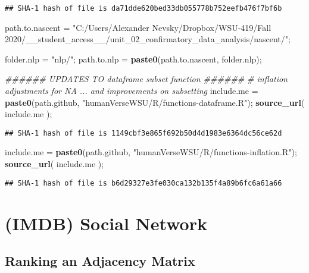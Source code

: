 \documentclass[
]{article}
\newenvironment{Shaded}{\begin{snugshade}}{\end{snugshade}}
\newcommand{\CommentTok}[1]{\textcolor[rgb]{0.56,0.35,0.01}{\textit{#1}}}
\newcommand{\KeywordTok}[1]{\textcolor[rgb]{0.13,0.29,0.53}{\textbf{#1}}}
\newcommand{\NormalTok}[1]{#1}
\newcommand{\StringTok}[1]{\textcolor[rgb]{0.31,0.60,0.02}{#1}}
\begin{document}
\begin{verbatim}
## SHA-1 hash of file is da71dde620bed33db055778b752eefb476f7bf6b
\end{verbatim}

\begin{Shaded}
\begin{Highlighting}[]
\NormalTok{path.to.nascent =}\StringTok{ "C:/Users/Alexander Nevsky/Dropbox/WSU{-}419/Fall 2020/\_\_student\_access\_\_/unit\_02\_confirmatory\_data\_analysis/nascent/"}\NormalTok{;}

\NormalTok{folder.nlp =}\StringTok{ "nlp/"}\NormalTok{;}
\NormalTok{path.to.nlp =}\StringTok{ }\KeywordTok{paste0}\NormalTok{(path.to.nascent, folder.nlp);}


\CommentTok{\#\#\#\#\#\# UPDATES TO dataframe subset function \#\#\#\#\#\#}
\CommentTok{\# inflation adjustments for NA ... and improvements on subsetting}
\NormalTok{include.me =}\StringTok{ }\KeywordTok{paste0}\NormalTok{(path.github, }\StringTok{"humanVerseWSU/R/functions{-}dataframe.R"}\NormalTok{);}
\KeywordTok{source\_url}\NormalTok{( include.me );}
\end{Highlighting}
\end{Shaded}

\begin{verbatim}
## SHA-1 hash of file is 1149cbf3e865f692b50d4d1983e6364dc56ce62d
\end{verbatim}

\begin{Shaded}
\begin{Highlighting}[]
\NormalTok{include.me =}\StringTok{ }\KeywordTok{paste0}\NormalTok{(path.github, }\StringTok{"humanVerseWSU/R/functions{-}inflation.R"}\NormalTok{);}
\KeywordTok{source\_url}\NormalTok{( include.me );}
\end{Highlighting}
\end{Shaded}

\begin{verbatim}
## SHA-1 hash of file is b6d29327e3fe030ca132b135f4a89b6fc6a61a66
\end{verbatim}

\hypertarget{imdb-social-network}{%
\section{(IMDB) Social Network}\label{imdb-social-network}}

\hypertarget{ranking-an-adjacency-matrix}{%
\subsection{Ranking an Adjacency
Matrix}\label{ranking-an-adjacency-matrix}}
\end{document}
